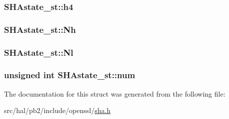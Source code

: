 \subsubsection[{\texorpdfstring{h4}{h4}}]{ S\+H\+Astate\+\_\+st\+::h4}\hypertarget{struct_s_h_astate__st_abd5013d45dc77b9f31df5818e02c80d1}{}\label{struct_s_h_astate__st_abd5013d45dc77b9f31df5818e02c80d1}
\subsubsection[{\texorpdfstring{Nh}{Nh}}]{ S\+H\+Astate\+\_\+st\+::\+Nh}\hypertarget{struct_s_h_astate__st_aedd943b5d71b31cb22d3a7fecf05575e}{}\label{struct_s_h_astate__st_aedd943b5d71b31cb22d3a7fecf05575e}
\subsubsection[{\texorpdfstring{Nl}{Nl}}]{ S\+H\+Astate\+\_\+st\+::\+Nl}\hypertarget{struct_s_h_astate__st_abe78332975c3f20418c6a32381904bba}{}\label{struct_s_h_astate__st_abe78332975c3f20418c6a32381904bba}
\subsubsection[{\texorpdfstring{num}{num}}]{\setlength{\rightskip}{0pt plus 5cm}unsigned int S\+H\+Astate\+\_\+st\+::num}\hypertarget{struct_s_h_astate__st_a58f39bf4cf04c1f4796f6df5031bc746}{}\label{struct_s_h_astate__st_a58f39bf4cf04c1f4796f6df5031bc746}


The documentation for this struct was generated from the following file\+:\begin{DoxyCompactItemize}
\item 
src/hal/pb2/include/openssl/\hyperlink{sha_8h}{sha.\+h}\end{DoxyCompactItemize}
